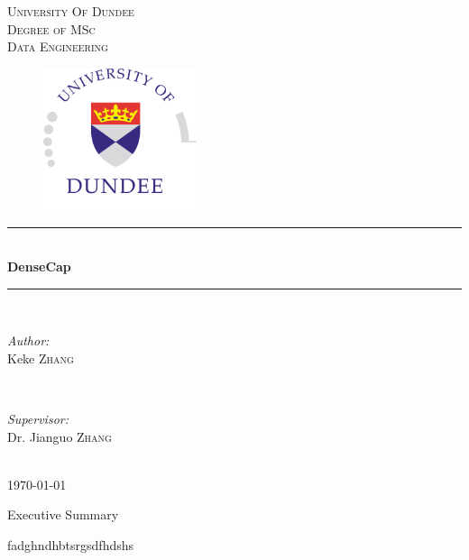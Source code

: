 \documentclass[12pt,a4paper]{report}
\begin{document}
\begin{titlepage}

\newcommand{\HRule}{\rule{\linewidth}{0.5mm}} 

\center 
 
\textsc{\LARGE University Of Dundee}\\[1.5cm] %
\textsc{\Large Degree of MSc}\\[0.5cm] %
\textsc{\large Data Engineering}\\[0.5cm] %


\begin{figure}
\centering
\includegraphics[width=0.4\textwidth]{dundee.jpg}
\end{figure}

\HRule \\[0.4cm]
{ \huge \bfseries DenseCap}\\[0.4cm] %
\HRule \\[1.5cm]
 
\begin{minipage}{0.4\textwidth}
\begin{flushleft} \large
\emph{Author:}\\
Keke \textsc{Zhang} %
\end{flushleft}
\end{minipage}
~
\begin{minipage}{0.4\textwidth}
\begin{flushright} \large
\emph{Supervisor:} \\
Dr. Jianguo \textsc{Zhang}
\end{flushright}
\end{minipage}\\[4cm]

{\large \today}\\[3cm] 


\vfill 

\end{titlepage}
\newpage
{}
\begin{center}
{\huge Executive Summary}
\end{center}
fadghndhbtsrgsdfhdshs
\newpage
\end{document}
